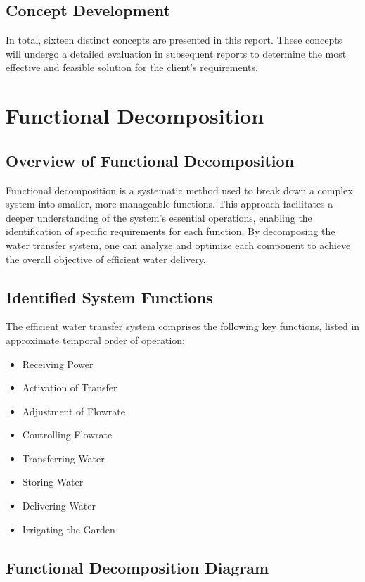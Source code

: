 \documentclass[12pt]{report}
\begin{document}
\subsection{Concept Development}
In total, sixteen distinct concepts are presented in this report. These concepts will undergo a detailed evaluation in subsequent reports to determine the most effective and feasible solution for the client's requirements.


\section{Functional Decomposition}

\subsection{Overview of Functional Decomposition}
Functional decomposition is a systematic method used to break down a complex system into smaller, more manageable functions. This approach facilitates a deeper understanding of the system's essential operations, enabling the identification of specific requirements for each function. By decomposing the water transfer system, one can analyze and optimize each component to achieve the overall objective of efficient water delivery.

\subsection{Identified System Functions}
The efficient water transfer system comprises the following key functions, listed in approximate temporal order of operation:

\begin{itemize}
    \item Receiving Power
    \item Activation of Transfer
    \item Adjustment of Flowrate
    \item Controlling Flowrate
    \item Transferring Water
    \item Storing Water
    \item Delivering Water
    \item Irrigating the Garden
\end{itemize}

\subsection{Functional Decomposition Diagram}
\end{document}
